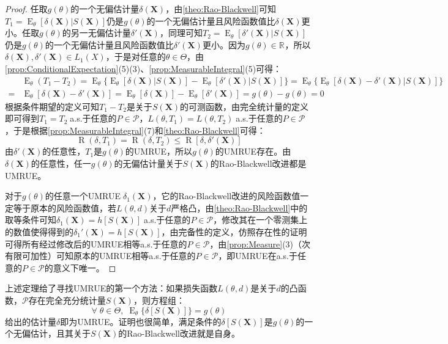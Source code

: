 \begin{proof}
	任取$g(\theta)$的一个无偏估计量$\delta(\mathbf{X})$，由\cref{theo:Rao-Blackwell}可知$T_1=\operatorname{E}_{\theta}[\delta(\mathbf{X})|S(\mathbf{X})]$仍是$g(\theta)$的一个无偏估计量且风险函数值比$\delta(\mathbf{X})$更小。任取$g(\theta)$的另一无偏估计量$\delta'(\mathbf{X})$，同理可知$T_2=\operatorname{E}_{\theta}[\delta'(\mathbf{X})|S(\mathbf{X})]$仍是$g(\theta)$的一个无偏估计量且风险函数值比$\delta'(\mathbf{X})$更小。因为$g(\theta)\in\mathbb{R}^{}$，所以$\delta(\mathbf{X}),\delta'(\mathbf{X})\in L_1(X)$，于是对任意的$\theta\in\Theta$，由\cref{prop:ConditionalExpectation}(5)(3)、\cref{prop:MeasurableIntegral}(5)可得：
	\begin{align*}
		&\operatorname{E}_{\theta}(T_1-T_2)=\operatorname{E}_{\theta}\{\operatorname{E}_{\theta}[\delta(\mathbf{X})|S(\mathbf{X})]-\operatorname{E}_{\theta}[\delta'(\mathbf{X})|S(\mathbf{X})]\}=\operatorname{E}_{\theta}\{\operatorname{E}_{\theta}[\delta(\mathbf{X})-\delta'(\mathbf{X})|S(\mathbf{X})]\} \\
		=&\operatorname{E}_{\theta}[\delta(\mathbf{X})-\delta'(\mathbf{X})]=\operatorname{E}_{\theta}[\delta(\mathbf{X})]-\operatorname{E}_{\theta}[\delta'(\mathbf{X})]=g(\theta)-g(\theta)=0
	\end{align*}
	根据条件期望的定义可知$T_1-T_2$是关于$S(\mathbf{X})$的可测函数，由完全统计量的定义即可得到$T_1=T_2\;$a.s.于任意的$P\in\mathscr{P}$，$L(\theta,T_1)=L(\theta,T_2)\;$a.s.于任意的$P\in\mathscr{P}$，于是根据\cref{prop:MeasurableIntegral}(7)和\cref{theo:Rao-Blackwell}可得：
	\begin{equation*}
		\operatorname{R}(\delta,T_1)=\operatorname{R}(\delta,T_2)\leqslant\operatorname{R}[\delta,\delta'(\mathbf{X})]
	\end{equation*}
	由$\delta'(\mathbf{X})$的任意性，$T_1$是$g(\theta)$的UMRUE，所以$g(\theta)$的UMRUE存在。由$\delta(\mathbf{X})$的任意性，任一$g(\theta)$的无偏估计量关于$S(\mathbf{X})$的Rao-Blackwell改进都是UMRUE。\par
	对于$g(\theta)$的任意一个UMRUE$\;\delta_1(\mathbf{X})$，它的Rao-Blackwell改进的风险函数值一定等于原本的风险函数值，若$L(\theta,d)$关于$d$严格凸，由\cref{theo:Rao-Blackwell}中的取等条件可知$\delta_1(\mathbf{X})=h[S(\mathbf{X})]\;$a.s.于任意的$P\in\mathscr{P}$，修改其在一个零测集上的数值使得得到的$\delta_1'(\mathbf{X})=h[S(\mathbf{X})]$，由完备性的定义，仿照存在性的证明可得所有经过修改后的UMRUE相等a.s.于任意的$P\in\mathscr{P}$，由\cref{prop:Measure}(3)（次有限可加性）可知原本的UMRUE相等a.s.于任意的$P\in\mathscr{P}$，即UMRUE在a.s.于任意的$P\in\mathscr{P}$的意义下唯一。
\end{proof}
\begin{note}
	上述定理给了寻找UMRUE的第一个方法：如果损失函数$L(\theta,d)$是关于$d$的凸函数，$\mathscr{P}$存在完全充分统计量$S(\mathbf{X})$，则方程组：
	\begin{equation*}
		\forall\;\theta\in\Theta,\;\operatorname{E}_{\theta}\{\delta[S(\mathbf{X})]\}=g(\theta)
	\end{equation*}
	给出的估计量$\delta$即为UMRUE。证明也很简单，满足条件的$\delta[S(\mathbf{X})]$是$g(\theta)$的一个无偏估计，且其关于$S(\mathbf{X})$的Rao-Blackwell改进就是自身。
\end{note}

